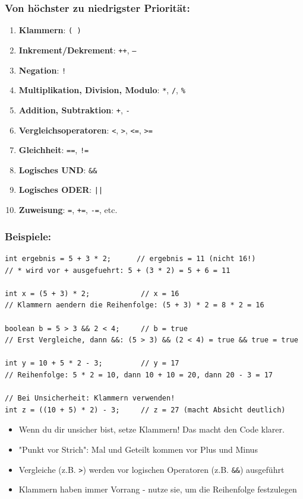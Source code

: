 \subsubsection*{Von höchster zu niedrigster Priorität:}

\begin{enumerate}
	\item \textbf{Klammern}: \texttt{( )}
	\item \textbf{Inkrement/Dekrement}: \texttt{++}, \texttt{--}
	\item \textbf{Negation}: \texttt{!}
	\item \textbf{Multiplikation, Division, Modulo}: \texttt{*}, \texttt{/}, \texttt{\%}
	\item \textbf{Addition, Subtraktion}: \texttt{+}, \texttt{-}
	\item \textbf{Vergleichsoperatoren}: \texttt{<}, \texttt{>}, \texttt{<=}, \texttt{>=}
	\item \textbf{Gleichheit}: \texttt{==}, \texttt{!=}
	\item \textbf{Logisches UND}: \texttt{\&\&}
	\item \textbf{Logisches ODER}: \texttt{||}
	\item \textbf{Zuweisung}: \texttt{=}, \texttt{+=}, \texttt{-=}, etc.
\end{enumerate}

\subsubsection*{Beispiele:}
\begin{lstlisting}
int ergebnis = 5 + 3 * 2;      // ergebnis = 11 (nicht 16!)
// * wird vor + ausgefuehrt: 5 + (3 * 2) = 5 + 6 = 11

int x = (5 + 3) * 2;            // x = 16
// Klammern aendern die Reihenfolge: (5 + 3) * 2 = 8 * 2 = 16

boolean b = 5 > 3 && 2 < 4;     // b = true
// Erst Vergleiche, dann &&: (5 > 3) && (2 < 4) = true && true = true

int y = 10 + 5 * 2 - 3;         // y = 17
// Reihenfolge: 5 * 2 = 10, dann 10 + 10 = 20, dann 20 - 3 = 17

// Bei Unsicherheit: Klammern verwenden!
int z = ((10 + 5) * 2) - 3;     // z = 27 (macht Absicht deutlich)
\end{lstlisting}

\begin{achtung}
	\begin{itemize}
		\item Wenn du dir unsicher bist, setze Klammern! Das macht den Code klarer.
		\item "Punkt vor Strich": Mal und Geteilt kommen vor Plus und Minus
		\item Vergleiche (z.B. \texttt{>}) werden vor logischen Operatoren (z.B. \texttt{\&\&}) ausgeführt
		\item Klammern haben immer Vorrang - nutze sie, um die Reihenfolge festzulegen
	\end{itemize}
\end{achtung}
